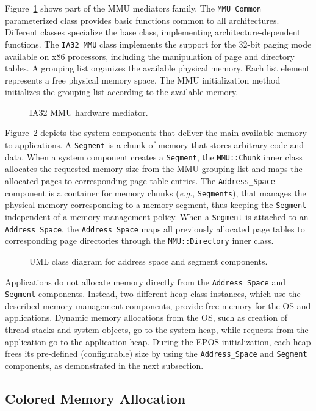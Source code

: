 \documentclass[10pt, conference, compsocconf]{IEEEtran}
\newcommand{\fig}[4][ht!]{
  \begin{figure}[#1]
    {\centering{\texttt{[image: fig/\#2]}}\par}
    \caption{#3}
    \label{fig:#2}
  \end{figure}
}
\begin{document}
Figure~\ref{fig:uml_class_mmu} shows part of the MMU mediators family. The \texttt{MMU\_Common} parameterized class provides basic functions common to all architectures. Different classes specialize the base class, implementing architecture-dependent functions. The \texttt{IA32\_MMU} class implements the support for the 32-bit paging mode available on x86 processors, including the manipulation of page and directory tables. A grouping list organizes the available physical memory. Each list element represents a free physical memory space. The MMU initialization method initializes the grouping list according to the available memory.

\fig{uml_class_mmu}{IA32 MMU hardware mediator.}{scale=.4}

Figure~\ref{fig:uml_class_as_seg} depicts the system components that deliver the main available memory to applications. A \texttt{Segment} is a chunk of memory that stores arbitrary code and data. When a system component creates a \texttt{Segment}, the \texttt{MMU::Chunk} inner class allocates the requested memory size from the MMU grouping list and maps the allocated pages to corresponding page table entries. The \texttt{Address\_Space} component is a container for memory chunks (\textit{e.g.}, \texttt{Segments}), that manages the physical memory corresponding to a memory segment, thus keeping the \texttt{Segment} independent of a memory management policy. When a \texttt{Segment} is attached to an \texttt{Address\_Space}, the \texttt{Address\_Space} maps all previously allocated page tables to corresponding page directories through the \texttt{MMU::Directory} inner class.

\fig{uml_class_as_seg}{UML class diagram for address space and segment components.}{scale=.4}

Applications do not allocate memory directly from the \texttt{Address\_Space} and \texttt{Segment} components. Instead, two different heap class instances, which use the described memory management components, provide free memory for the OS and applications. Dynamic memory allocations from the OS, such as creation of thread stacks and system objects, go to the system heap, while requests from the application go to the application heap. During the EPOS initialization, each heap frees its pre-defined (configurable) size by using the \texttt{Address\_Space} and \texttt{Segment} components, as demonstrated in the next subsection.

\subsection{Colored Memory Allocation}
\end{document}
